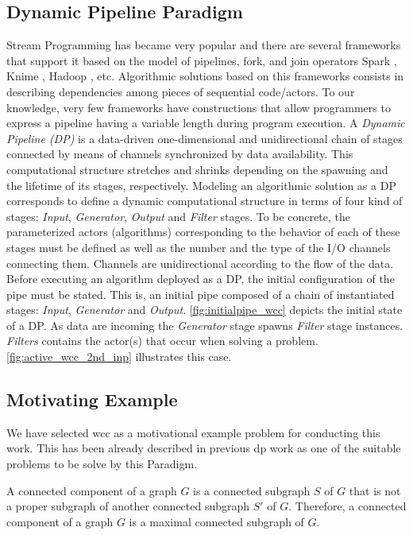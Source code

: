 \documentclass[preprint]{elsarticle}
\begin{document}
\subsection{Dynamic Pipeline Paradigm}\label{sub:sec:dp:par}
%
Stream Programming has became very popular and there are several frameworks that support it  based on the model of pipelines, fork, and join operators Spark \cite{apachespark}, Knime \cite{knime}, Hadoop \cite{hadoop}, etc. Algorithmic solutions based on this frameworks consists in describing dependencies among pieces of sequential  code/actors. To our knowledge, very few frameworks have constructions that allow programmers to express a pipeline having a variable length during program execution. A \textit{Dynamic Pipeline  (DP)}  \cite{dpdef} is a data-driven one-dimensional and unidirectional chain of stages connected by means of channels synchronized by data availability. This computational structure stretches and shrinks depending on the spawning and the lifetime of its stages, respectively. Modeling an algorithmic solution as a DP corresponds to define a dynamic computational structure  in terms of four kind of stages:  \textit{Input},  \textit{Generator},  \textit{Output} and \textit{Filter} stages.  To be concrete, the parameterized actors (algorithms)  corresponding to the behavior of each of these stages must be defined as well as the number and the type of the I/O channels connecting them. Channels are unidirectional  according to the flow of the data. Before executing an algorithm deployed as a  DP, the initial configuration of the pipe must be stated. This is, an initial pipe composed of a chain of instantiated stages: \textit{Input},  \textit{Generator} and \textit{Output}. \autoref{fig:initialpipe_wcc} depicts the initial state of a DP.  As data are incoming  the \textit{Generator} stage spawns \textit{Filter} stage instances. \textit{Filters} contains the actor(s) that occur when solving a problem. \autoref{fig:active_wcc_2nd_inp} illustrates this case.
%
\subsection{Motivating Example}\label{sub:sec:mot:ex}
We have selected \acrfull{wcc} as a motivational example problem for conducting this work. This has been already described in previous \acrshort{dp} work \citep{dpdef} as one of the suitable problems to be solve by this Paradigm.

\begin{defin}
A connected component of a graph $G$ is a connected subgraph $S$ of $G$ that is not a proper subgraph
of another connected subgraph $S'$ of $G$. Therefore, a connected component of a graph $G$ is a maximal
connected subgraph of $G$.
\end{defin}
\end{document}
